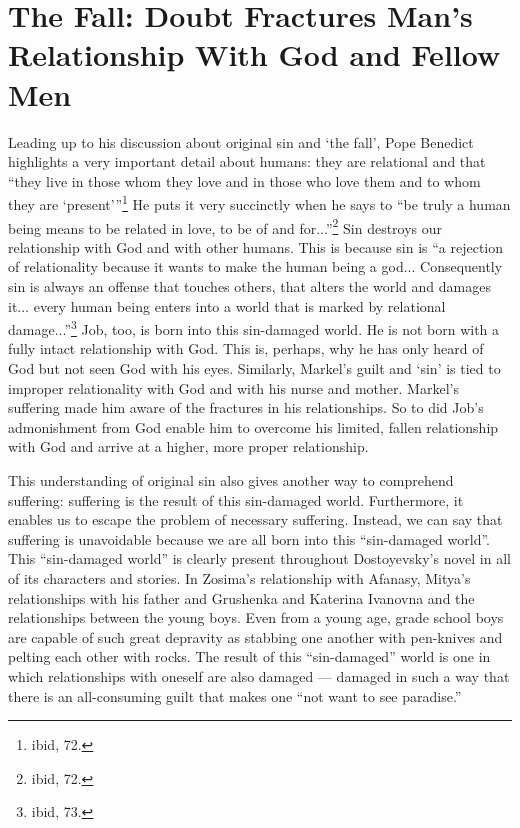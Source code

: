 \section{The Fall: Doubt Fractures Man's Relationship With God and Fellow Men}
Leading up to his discussion about original sin and `the fall', Pope Benedict highlights a very important detail about humans: they are relational and that ``they live in those whom they love and in those who love them and to whom they are `present'''\footnote{ibid, 72.} He puts it very succinctly when he says to ``be truly a human being means to be related in love, to be of and for...''\footnote{ibid, 72.} Sin destroys our relationship with God and with other humans. This is because sin is ``a rejection of relationality because it wants to make the human being a god... Consequently sin is always an offense that touches others, that alters the world and damages it... every human being enters into a world that is marked by relational damage...''\footnote{ibid, 73.} Job, too, is born into this sin-damaged world. He is not born with a fully intact relationship with God. This is, perhaps, why he has only heard of God but not seen God with his eyes. Similarly, Markel's guilt and `sin' is tied to improper relationality with God and with his nurse and mother. Markel's suffering made him aware of the fractures in his relationships. So to did Job's admonishment from God enable him to overcome his limited, fallen relationship with God and arrive at a higher, more proper relationship. 

This understanding of original sin also gives another way to comprehend suffering: suffering is the result of this sin-damaged world. Furthermore, it enables us to escape the problem of necessary suffering. Instead, we can say that suffering is unavoidable because we are all born into this ``sin-damaged world''. This ``sin-damaged world'' is clearly present throughout Dostoyevsky's novel in all of its characters and stories. In Zosima's relationship with Afanasy, Mitya's relationships with his father and Grushenka and Katerina Ivanovna and the relationships between the young boys. Even from a young age, grade school boys are capable of such great depravity as stabbing one another with pen-knives and pelting each other with rocks. The result of this ``sin-damaged'' world is one in which relationships with oneself are also damaged --- damaged in such a way that there is an all-consuming guilt that makes one ``not want to see paradise.''

